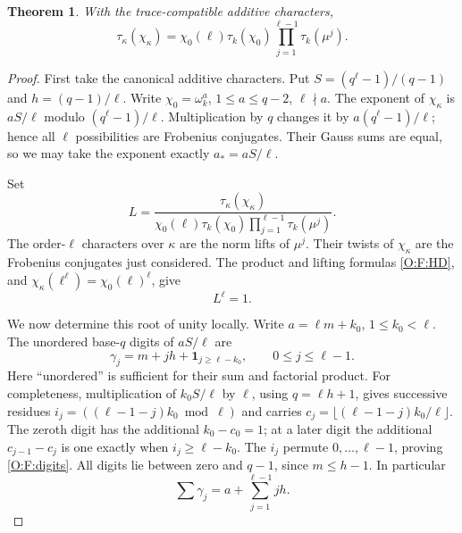 \documentclass[11pt]{amsart}
\newtheorem{theorem}{Theorem}[section]
\theoremstyle{definition}
\theoremstyle{remark}
\begin{document}
\begin{theorem}\label{O:F:finite}
With the trace-compatible additive characters,
\begin{equation}\label{O:F:finiteidentity}
 \tau_\kappa(\chi_\kappa)
 =\chi_0(\ell)\tau_k(\chi_0)
       \prod_{j=1}^{\ell-1}\tau_k(\mu^j).
\end{equation}
\end{theorem}
\begin{proof}
First take the canonical additive characters. Put
$S=(q^\ell-1)/(q-1)$ and $h=(q-1)/\ell$.
Write $\chi_0=\omega_k^a$, $1\le a\le q-2$, $\ell\nmid a$.
The exponent of $\chi_\kappa$ is $aS/\ell$ modulo
$(q^\ell-1)/\ell$. Multiplication by $q$ changes it by
$a(q^\ell-1)/\ell$; hence all $\ell$ possibilities are Frobenius
conjugates. Their Gauss sums are equal, so we may take the exponent
exactly $a_*=aS/\ell$.

Set
\[
 L=\frac{\tau_\kappa(\chi_\kappa)}
 {\chi_0(\ell)\tau_k(\chi_0)\prod_{j=1}^{\ell-1}\tau_k(\mu^j)}.
\]
The order-$\ell$ characters over $\kappa$ are the norm lifts of
$\mu^j$. Their twists of $\chi_\kappa$ are the Frobenius conjugates
just considered. The product and lifting formulas \eqref{O:F:HD}, and
$\chi_\kappa(\ell^\ell)=\chi_0(\ell)^\ell$, give
\begin{equation}\label{O:F:Lpower}
 L^\ell=1.
\end{equation}

We now determine this root of unity locally. Write $a=\ell m+k_0$,
$1\le k_0<\ell$. The unordered base-$q$ digits of $aS/\ell$ are
\begin{equation}\label{O:F:digits}
 \gamma_j=m+jh+\mathbf1_{j\ge\ell-k_0},\qquad0\le j\le\ell-1.
\end{equation}
Here ``unordered'' is sufficient for their sum and factorial product.
For completeness, multiplication of $k_0S/\ell$ by $\ell$, using
$q=\ell h+1$, gives successive residues
$i_j=((\ell-1-j)k_0\bmod\ell)$ and carries
$c_j=\lfloor(\ell-1-j)k_0/\ell\rfloor$.
The zeroth digit has the additional $k_0-c_0=1$; at a later digit the
additional $c_{j-1}-c_j$ is one exactly when $i_j\ge\ell-k_0$.
The $i_j$ permute $0,\ldots,\ell-1$, proving \eqref{O:F:digits}.
All digits lie between zero and $q-1$, since $m\le h-1$.
In particular
\begin{equation}\label{O:F:digitsum}
 \sum\gamma_j=a+\sum_{j=1}^{\ell-1}jh.
\end{equation}


\end{proof}
\end{document}
